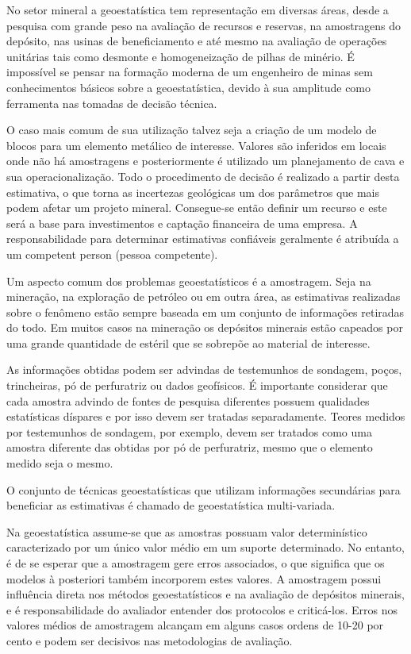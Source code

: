 No setor mineral a geoestatística tem representação em diversas áreas, desde a pesquisa com grande peso na avaliação de recursos e reservas, na amostragens do depósito, nas usinas de beneficiamento e até mesmo na avaliação de operações unitárias tais como desmonte e homogeneização de pilhas de minério. É impossível se pensar na formação moderna de um engenheiro de minas sem conhecimentos básicos sobre a geoestatística, devido à sua amplitude como ferramenta nas tomadas de decisão técnica.  

O caso mais comum de sua utilização talvez seja a criação de um modelo de blocos para um elemento metálico de interesse. Valores são inferidos em locais onde não há amostragens e posteriormente é utilizado um planejamento de cava e sua operacionalização. Todo o procedimento de decisão é realizado a partir desta estimativa, o que torna as incertezas geológicas um dos parâmetros que mais podem afetar um projeto mineral. Consegue-se então definir um recurso e este será a base para investimentos e captação financeira de uma empresa. A responsabilidade para determinar estimativas confiáveis geralmente é atribuída a um competent person (pessoa competente).   

Um aspecto comum dos problemas geoestatísticos é a amostragem. Seja na mineração, na exploração de petróleo ou em outra área, as estimativas realizadas sobre o fenômeno estão sempre baseada em um conjunto de informações retiradas do todo. Em muitos casos na mineração os depósitos minerais estão capeados por uma grande quantidade de estéril que se sobrepõe ao material de interesse.

As informações obtidas podem ser advindas de testemunhos de sondagem, poços, trincheiras, pó de perfuratriz ou dados geofísicos. É importante considerar que cada amostra advindo de fontes de pesquisa diferentes possuem qualidades estatísticas díspares e por isso devem ser tratadas separadamente. Teores medidos por testemunhos de sondagem, por exemplo, devem ser tratados como uma amostra diferente das obtidas por pó de perfuratriz, mesmo que o elemento medido seja o mesmo.

O conjunto de técnicas geoestatísticas que utilizam informações secundárias para beneficiar as estimativas é chamado de geoestatística multi-variada.   

Na geoestatística assume-se que as amostras possuam valor determinístico caracterizado por um único valor médio em um suporte determinado. No entanto, é de se esperar que a amostragem gere erros associados, o que significa que os modelos à posteriori também incorporem estes valores. A amostragem possui influência direta nos métodos geoestatísticos e na avaliação de depósitos minerais, e é responsabilidade do avaliador entender dos protocolos e criticá-los. Erros nos valores médios de amostragem alcançam em alguns casos ordens de 10-20 por cento e podem ser decisivos nas metodologias de avaliação.

